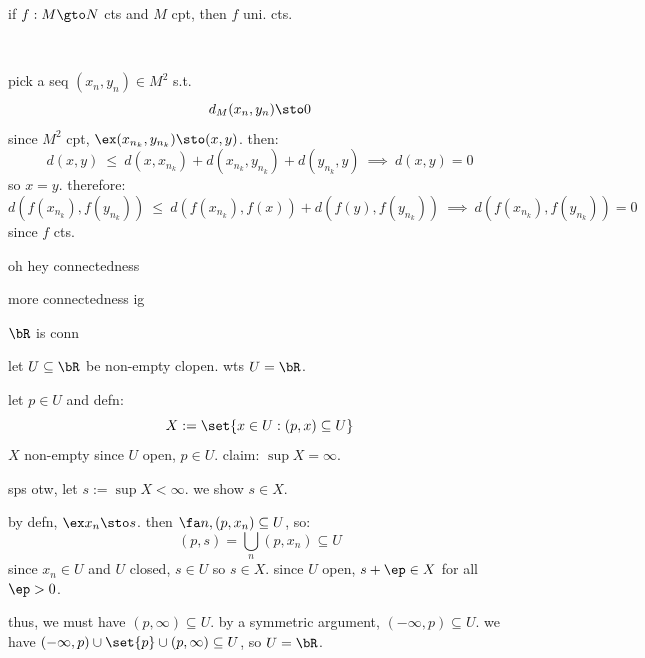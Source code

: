 \begin{thm}
    if $f:M\gto N$ cts and $M$ cpt, then $f$ uni. cts.
\end{thm} \

\begin{pf}[source=Primary Source Material]
    pick a seq $(x_{n},y_{n})\in M^{2}$ s.t.
	\begin{equation*}
	    d_{M}(x_{n},y_{n})\sto0
	\end{equation*}
	since $M^{2}$ cpt, $\ex(x_{n_{k}},y_{n_{k}})\sto(x,y)$. then:
	\begin{equation*}
	    d(x,y) \ \leq \ d(x,x_{n_{k}})+d(x_{n_{k}},y_{n_{k}})+d(y_{n_{k}},y)
		\ \implies \ d(x,y)=0
	\end{equation*}
	so $x=y$. therefore:
	\begin{equation*}
	    d(f(x_{n_{k}}),f(y_{n_{k}})) \ \leq \
		d(f(x_{n_{k}}),f(x)) + d(f(y),f(y_{n_{k}})) \ \implies \
		d(f(x_{n_{k}}),f(y_{n_{k}})) = 0
	\end{equation*}
	since $f$ cts.
\end{pf}

oh hey connectedness

more connectedness ig

\newpage
\begin{thm}
    $\bR$ is conn
\end{thm}

\begin{pf}[source=Primary Source Material]
    let $U\subseteq\bR$ be non-empty clopen. wts $U=\bR$.

	let $p\in U$ and defn:
	\begin{equation*}
	    X:=\set{x\in U:(p,x)\subseteq U}
	\end{equation*}
	$X$ non-empty since $U$ open, $p\in U$. claim: $\sup X=\infty$.
	\begin{block}
	    sps otw, let $s:=\sup X<\infty$. we show $s \in X$.

		by defn, $\ex x_{n}\sto s$.
		then $\fa n, (p,x_{n})\subseteq U$, so:
		\begin{equation*}
			(p,s)=\bigcup_{n}(p,x_{n})\subseteq U
		\end{equation*}
		since $x_{n}\in U$ and $U$ closed, $s \in U$ so $s \in X$.
		since $U$ open, $s + \ep\in X$ for all $\ep>0$.
	\end{block}
	thus, we must have $(p,\infty)\subseteq U$.
	by a symmetric argument, $(-\infty,p)\subseteq U$. we have
	$ (-\infty,p)\cup\set{p}\cup(p,\infty)\subseteq U $, so $U=\bR$.
\end{pf}

